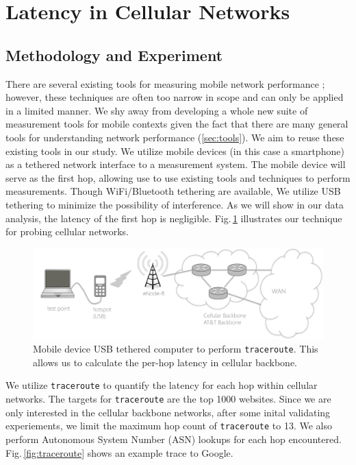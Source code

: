\section{Latency in Cellular Networks}
\label{sec:latency-in-cellular}

\subsection{Methodology and Experiment}
\label{sec:methodology}

There are several existing tools for measuring mobile network performance \cite{speedtest, huang2011mobiperf}; however, these techniques are often too narrow in scope and can only be applied in a limited manner. We shy away from developing a whole new suite of measurement tools for mobile contexts given the fact that there are many general tools for understanding network performance (\ref{sec:tools}). We aim to reuse these existing tools in our study. We utilize mobile devices (in this case a smartphone) as a tethered network interface to a measurement system. The mobile device will serve as the first hop, allowing use to use existing tools and techniques to perform measurements. Though WiFi/Bluetooth tethering are available, We utilize USB tethering to minimize the possibility of interference. As we will show in our data analysis, the latency of the first hop is negligible. Fig.\,\ref{fig:mobile_networks_method} illustrates our technique for probing cellular networks.

\begin{figure}[!tbh]
  \centering
  \includegraphics[width=\linewidth]{../figs/mobile_networks_method.pdf}
  \vspace{-1em}
  \caption{Mobile device USB tethered computer to perform \texttt{traceroute}. This allows us to calculate the per-hop latency in cellular backbone.}
  \label{fig:mobile_networks_method}
\end{figure}

We utilize \texttt{traceroute} to quantify the latency for each hop within cellular networks. The targets for \texttt{traceroute} are the top 1000 websites. Since we are only interested in the cellular backbone networks, after some inital validating experiements, we limit the maximum hop count of \texttt{traceroute} to 13. We also perform Autonomous System Number (ASN) lookups for each hop encountered. Fig.\,\ref{fig:traceroute} shows an example trace to Google.

